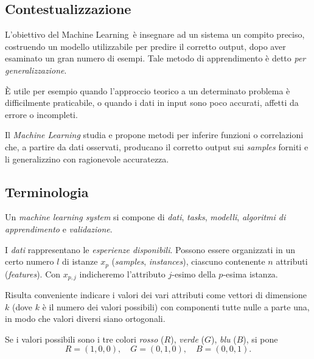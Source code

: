 
\def\ml{Machine Learning}


\subsection{Contestualizzazione}

L'obiettivo del \ml\ è insegnare ad un sistema un compito preciso, costruendo un modello utilizzabile per predire il corretto output, dopo aver esaminato un gran numero di esempi. Tale metodo di apprendimento è detto \emph{per generalizzazione}.

È utile per esempio quando l'approccio teorico a un determinato problema è difficilmente praticabile, o quando i dati in input sono poco accurati, affetti da errore o incompleti.

\begin{definition}
Il \emph{\ml} studia e propone metodi per inferire funzioni o correlazioni che, a partire da dati osservati, producano il corretto output sui \emph{samples} forniti e li generalizzino con ragionevole accuratezza.
\end{definition}

\subsection{Terminologia}

Un \emph{machine learning system} si compone di \emph{dati}, \emph{tasks}, \emph{modelli}, \emph{algoritmi di apprendimento} e \emph{validazione}.

\begin{definition}[Dati]
I \emph{dati} rappresentano le \emph{esperienze disponibili}. Possono essere organizzati in un certo numero $l$ di istanze $x_p$ (\emph{samples}, \emph{instances}), ciascuno contenente $n$ attributi (\emph{features}). Con $x_{p,j}$ indicheremo l'attributo $j$-esimo della $p$-esima istanza. 
\end{definition}

Risulta conveniente indicare i valori dei vari attributi come vettori di dimensione $k$ (dove $k$ è il numero dei valori possibili) con componenti tutte nulle a parte una, in modo che valori diversi siano ortogonali.
\begin{example}
Se i valori possibili sono i tre colori \emph{rosso} ($R$), \emph{verde} ($G$), \emph{blu} ($B$), si pone
\begin{equation}
R=(1,0,0),\quad G=(0,1,0),\quad B=(0,0,1).
\end{equation}
\end{example}


